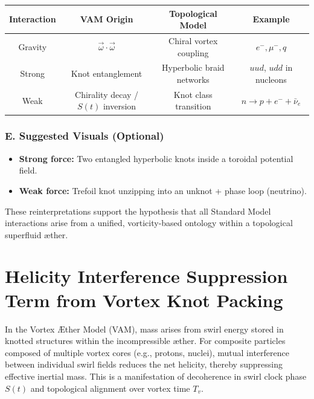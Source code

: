 \documentclass[12pt]{article}
\begin{document}
\begin{center}
\begin{tabular}{|c|c|c|c|}
\hline
\textbf{Interaction} & \textbf{VAM Origin} & \textbf{Topological Model} & \textbf{Example} \\\hline
Gravity & $\vec{\omega} \cdot \vec{\omega}$ & Chiral vortex coupling & $e^-, \mu^-, q$ \\\hline
Strong  & Knot entanglement & Hyperbolic braid networks & $uud$, $udd$ in nucleons \\\hline
Weak    & Chirality decay / $S(t)$ inversion & Knot class transition & $n \rightarrow p + e^- + \bar{\nu}_e$ \\\hline
\end{tabular}
\end{center}

\subsubsection*{E. Suggested Visuals (Optional)}

\begin{itemize}
    \item \textbf{Strong force:} Two entangled hyperbolic knots inside a toroidal potential field.
    \item \textbf{Weak force:} Trefoil knot unzipping into an unknot + phase loop (neutrino).
\end{itemize}

\bigskip

These reinterpretations support the hypothesis that all Standard Model interactions arise from a unified, vorticity-based ontology within a topological superfluid æther.





\section{Helicity Interference Suppression Term from Vortex Knot Packing}

In the Vortex \AE{}ther Model (VAM), mass arises from swirl energy stored in knotted structures within the incompressible \ae{}ther. For composite particles composed of multiple vortex cores (e.g., protons, nuclei), mutual interference between individual swirl fields reduces the net helicity, thereby suppressing effective inertial mass. This is a manifestation of decoherence in swirl clock phase \( S(t) \) and topological alignment over vortex time \( T_v \).
\end{document}

